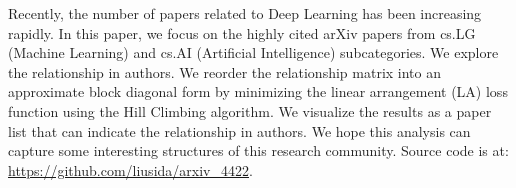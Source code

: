 Recently, the number of papers related to Deep Learning has been increasing rapidly.
In this paper, we focus on the highly cited arXiv papers from cs.LG (Machine Learning) and cs.AI (Artificial Intelligence) subcategories.
We explore the relationship in authors.
We reorder the relationship matrix into an approximate block diagonal form by minimizing the linear arrangement (LA) loss function using the Hill Climbing algorithm.
We visualize the results as a paper list that can indicate the relationship in authors.
We hope this analysis can capture some interesting structures of this research community.
Source code is at: \url{https://github.com/liusida/arxiv_4422}.
